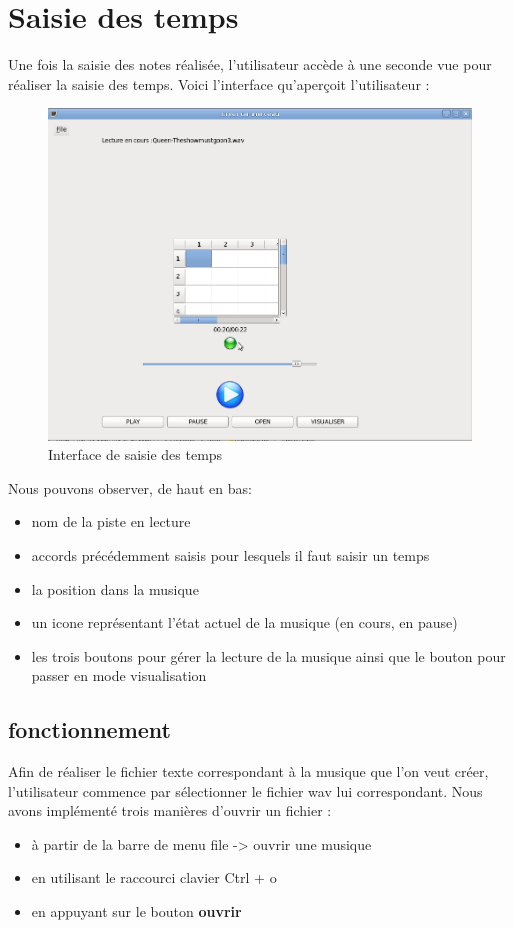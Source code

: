 \section{Saisie des temps}
Une fois la saisie des notes réalisée, l'utilisateur accède à une seconde vue pour réaliser la saisie des temps. Voici l'interface qu'aperçoit l'utilisateur :
\begin{figure}[!h]
\begin{center}
\includegraphics[scale=0.5]{editeur.png}
\end{center}
\caption{Interface de saisie des temps}
\end{figure}
Nous pouvons observer, de haut en bas:
\begin{itemize}
\item nom de la piste en lecture
\item accords précédemment saisis pour lesquels il faut saisir un temps
\item la position dans la musique
\item un icone représentant l'état actuel de la musique (en cours, en pause)
\item les trois boutons pour gérer la lecture de la musique ainsi que le bouton pour passer en mode visualisation
\end{itemize}
\subsection{fonctionnement}

\indent Afin de réaliser le fichier texte correspondant à la musique que l'on veut créer, l'utilisateur commence par sélectionner le fichier wav lui correspondant. Nous avons implémenté trois manières d'ouvrir un fichier :
\begin{itemize}
\item à partir de la barre de menu file -> ouvrir une musique
\item en utilisant le raccourci clavier Ctrl + o
\item en appuyant sur le bouton \textbf{ouvrir}
\end{itemize}

